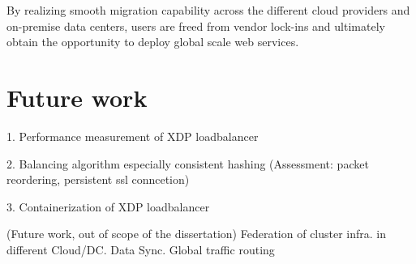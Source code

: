 By realizing smooth migration capability across the different cloud providers and on-premise data centers, users are freed from vendor lock-ins and ultimately obtain the opportunity to deploy global scale web services.


\section{Future work}\label{Future work}

1. Performance measurement of XDP loadbalancer

2. Balancing algorithm especially consistent hashing
(Assessment: packet reordering, persistent ssl conncetion)
 
3. Containerization of XDP loadbalancer


(Future work, out of scope of the dissertation)
Federation of cluster infra. in different Cloud/DC.
Data Sync.
Global traffic routing

